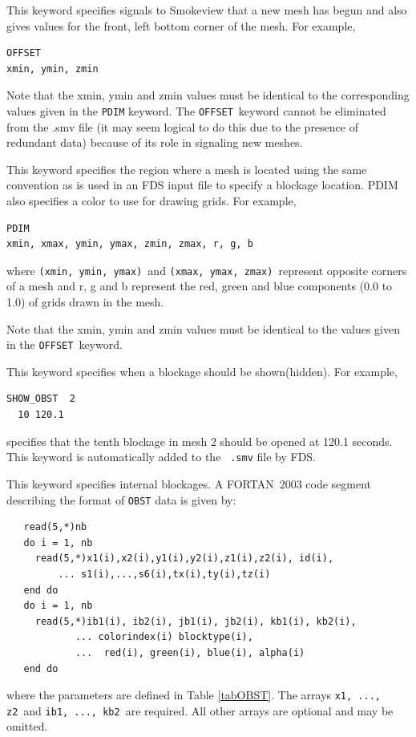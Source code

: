 \documentclass[11pt,twoside]{book}
\newcommand{\hitem}[1]{\item[{\bf #1} \hfill]}
\begin{document}
\hitem{OFFSET}This keyword specifies signals to Smokeview that a new mesh has begun and also
gives values for the front, left bottom corner of the mesh.  For example,
\begin{lstlisting}
OFFSET
xmin, ymin, zmin
\end{lstlisting}

Note that the xmin, ymin and zmin values must be identical to the corresponding values given in
the {\tt PDIM} keyword. The {\tt OFFSET}\ keyword cannot be eliminated from the .smv file
(it may seem logical to do this due
to the presence of redundant data) because of its role in signaling new meshes.

\hitem{PDIM}This keyword specifies the region where a mesh is located
using the same convention as is used in an FDS input file to specify a blockage location.
PDIM also specifies a color to use for drawing grids.  For example,
\begin{lstlisting}
PDIM
xmin, xmax, ymin, ymax, zmin, zmax, r, g, b
\end{lstlisting}
where {\tt (xmin,~ymin,~ymax)}\ and {\tt (xmax,~ymax,~zmax)}\  represent opposite corners of a mesh
and r, g and b represent the red, green and blue components (0.0 to 1.0) of grids drawn
in the mesh.

Note that the xmin, ymin and zmin values must be identical to the values given in the
{\tt OFFSET}\ keyword.


\hitem{SHOW\_OBST(HIDE\_OBST)} This keyword specifies when a
blockage should be shown(hidden). For example,
\begin{lstlisting}
SHOW_OBST  2
  10 120.1
\end{lstlisting}
specifies that the tenth blockage in mesh 2 should be opened at
120.1 seconds.  This keyword is automatically added to the {\tt
.smv} file by FDS.

\hitem{OBST}This keyword specifies internal blockages. A
FORTAN~2003 code segment describing the format of {\tt OBST} data
is given by:
\begin{lstlisting}
   read(5,*)nb
   do i = 1, nb
     read(5,*)x1(i),x2(i),y1(i),y2(i),z1(i),z2(i), id(i),
         ... s1(i),...,s6(i),tx(i),ty(i),tz(i)
   end do
   do i = 1, nb
     read(5,*)ib1(i), ib2(i), jb1(i), jb2(i), kb1(i), kb2(i),
            ... colorindex(i) blocktype(i),
            ...  red(i), green(i), blue(i), alpha(i)
   end do
\end{lstlisting}
where the parameters are defined in Table \ref{tabOBST}.  The arrays {\tt x1, ..., z2}\ and {\tt ib1, ..., kb2}\ are
required. All other arrays are optional and may be omitted.
\end{document}
